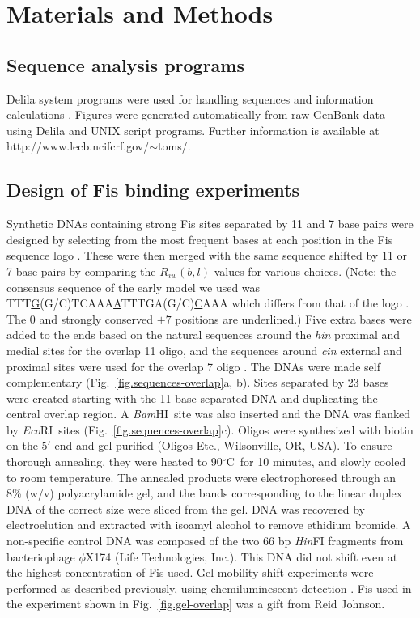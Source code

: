 \documentclass[doublespacing]{narfront}
\newcommand{\fig}[1]{Fig.~\ref{#1}} %
\newcommand{\bamhi}{{\emph{Bam}HI}} %
\newcommand{\ecori}{{\emph{Eco}RI}} %
\newcommand{\degreesC}{${}^\circ \mbox{C}$}
\newcommand{\ribl}{\riw(b,l)}
\newcommand{\riw}{R_{iw}}
\begin{document}

\section*{Materials and Methods}

\subsection*{Sequence analysis programs}

Delila system programs were used
for handling sequences and information calculations
\cite{Schneider1982,Schneider1984,Schneider1986,Schneider.Stephens1990,Stephens.Schneider.Splice,Schneider.Ri,Schneider.walker}.
Figures were generated automatically
from raw GenBank data using Delila and UNIX
script programs.
Further information is available at
http://www.lecb.ncifcrf.gov/$\sim$toms/.

\subsection*{Design of Fis binding experiments}

Synthetic DNAs containing
strong Fis sites separated by 11 and 7 base pairs were designed
by selecting from the most frequent bases at each position in the
Fis sequence logo
\cite{Hengen.fisinfo}.
These were then merged
with the same sequence shifted by 11 or 7 base pairs
by comparing the $\ribl$ values for various choices.
(Note: the consensus sequence of the early model we used
was TTT\underline{G}(G/C)TCAAA\underline{A}TTTGA(G/C)\underline{C}AAA
which differs from
that of the logo
\cite{Schneider.Zen2002}.
The $0$ and strongly conserved $\pm 7$ positions are underlined.)
Five extra bases were added to the ends based on the natural
sequences around the \emph{hin}
proximal and medial sites
for the overlap 11 oligo,
and
the sequences around \emph{cin}
external and proximal sites
were used for the overlap 7 oligo \cite{Hengen.fisinfo}.
The DNAs were made self complementary
(\fig{fig.sequences-overlap}a, b).
Sites separated by 23 bases were created starting with the 11 base
separated DNA and duplicating the central overlap region.
A \bamhi\ site was also inserted
and the DNA was flanked by \ecori\ sites
(\fig{fig.sequences-overlap}c).
Oligos were synthesized
with biotin on the $5'$ end
and gel purified
(Oligos Etc., Wilsonville, OR, USA).
To ensure thorough annealing, they were heated to
90\degreesC\ for 10 minutes,
and slowly cooled to room temperature.
The annealed products were electrophoresed through
an 8\% (w/v) polyacrylamide gel, and the bands corresponding
to the linear duplex DNA of the correct size were
sliced from the gel.  DNA was recovered by
electroelution and extracted with isoamyl alcohol to
remove ethidium bromide.
A non-specific control DNA
was composed of the two 66 bp \emph{Hin}FI
fragments from bacteriophage $\phi$X174
(Life Technologies, Inc.).
This DNA did not shift even at the highest concentration of Fis used.
Gel mobility shift experiments were performed
as described previously,
using chemiluminescent detection
\cite{Hengen.fisinfo}.
Fis used in the experiment shown in
\fig{fig.gel-overlap}
was a gift from Reid Johnson.
\end{document}
